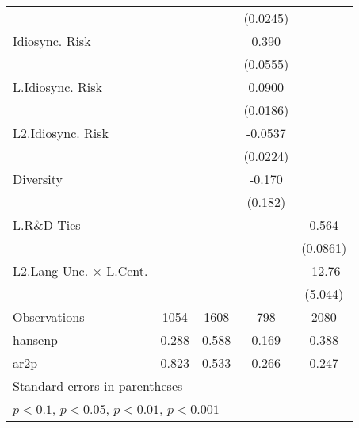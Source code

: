 {\begin{tabular}{l*{4}{c}}
                    &                     &                     &    (0.0245)         &                     \\
Idiosync. Risk      &                     &                     &       0.390\sym{***}&                     \\
                    &                     &                     &    (0.0555)         &                     \\
L.Idiosync. Risk    &                     &                     &      0.0900\sym{***}&                     \\
                    &                     &                     &    (0.0186)         &                     \\
L2.Idiosync. Risk   &                     &                     &     -0.0537\sym{*}  &                     \\
                    &                     &                     &    (0.0224)         &                     \\
Diversity           &                     &                     &      -0.170         &                     \\
                    &                     &                     &     (0.182)         &                     \\
L.R\&D Ties         &                     &                     &                     &       0.564\sym{***}\\
                    &                     &                     &                     &    (0.0861)         \\
L2.Lang Unc. $\times$ L.Cent.&                     &                     &                     &      -12.76\sym{*}  \\
                    &                     &                     &                     &     (5.044)         \\
\hline
Observations        &        1054         &        1608         &         798         &        2080         \\
hansenp             &       0.288         &       0.588         &       0.169         &       0.388         \\
ar2p                &       0.823         &       0.533         &       0.266         &       0.247         \\
\hline\hline
\multicolumn{5}{l}{\footnotesize Standard errors in parentheses}\\
\multicolumn{5}{l}{\footnotesize \sym{+} \(p<0.1\), \sym{*} \(p<0.05\), \sym{**} \(p<0.01\), \sym{***} \(p<0.001\)}\\
\end{tabular}
}
